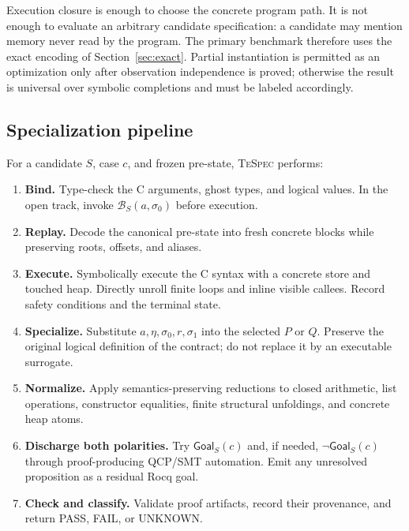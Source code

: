 \documentclass[10pt]{article}
\newcommand{\tespec}{\textsc{TeSpec}}
\newcommand{\rocq}{Rocq}
\newcommand{\pass}{\textsf{PASS}}
\newcommand{\fail}{\textsf{FAIL}}
\newcommand{\unknown}{\textsf{UNKNOWN}}
\newcommand{\bind}{\mathcal{B}}
\newcommand{\ghost}{\eta}
\newcommand{\goal}{\mathsf{Goal}}
\begin{document}
Execution closure is enough to choose the concrete program path.  It is not
enough to evaluate an arbitrary candidate specification: a candidate may
mention memory never read by the program.  The primary benchmark therefore
uses the exact encoding of Section~\ref{sec:exact}.  Partial instantiation is
permitted as an optimization only after observation independence is proved;
otherwise the result is universal over symbolic completions and must be
labeled accordingly.

\subsection{Specialization pipeline}

For a candidate $S$, case $c$, and frozen pre-state, \tespec{} performs:

\begin{enumerate}[leftmargin=1.4em]
  \item \textbf{Bind.}  Type-check the C arguments, ghost types, and logical
        values.  In the open track, invoke $\bind_S(a,\sigma_0)$ before
        execution.
  \item \textbf{Replay.}  Decode the canonical pre-state into fresh concrete
        blocks while preserving roots, offsets, and aliases.
  \item \textbf{Execute.}  Symbolically execute the C syntax with a concrete
        store and touched heap.  Directly unroll finite loops and inline visible
        callees.  Record safety conditions and the terminal state.
  \item \textbf{Specialize.}  Substitute $a,\ghost,\sigma_0,r,\sigma_1$ into
        the selected $P$ or $Q$.  Preserve the original logical definition of
        the contract; do not replace it by an executable surrogate.
  \item \textbf{Normalize.}  Apply semantics-preserving reductions to closed
        arithmetic, list operations, constructor equalities, finite structural
        unfoldings, and concrete heap atoms.
  \item \textbf{Discharge both polarities.}  Try $\goal_S(c)$ and, if needed,
        $\neg\goal_S(c)$ through proof-producing QCP/SMT automation.  Emit any
        unresolved proposition as a residual \rocq{} goal.
  \item \textbf{Check and classify.}  Validate proof artifacts, record their
        provenance, and return \pass, \fail, or \unknown.
\end{enumerate}
\end{document}
